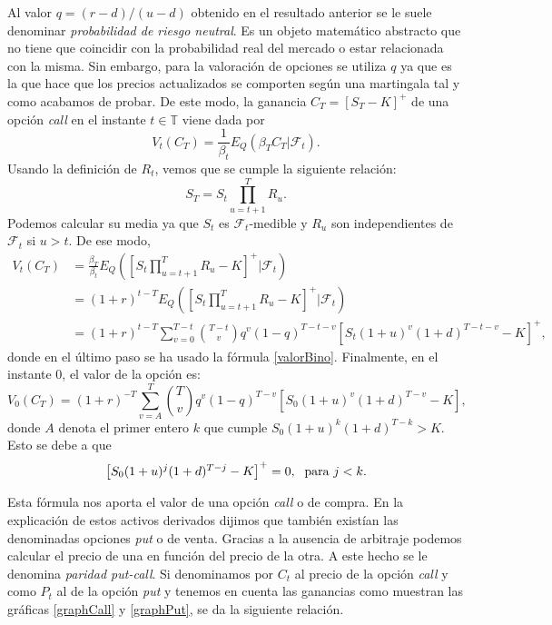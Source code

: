 Al valor $ q = (r-d)/(u-d) $ obtenido en el resultado anterior se le suele denominar \textit{probabilidad de riesgo neutral}. Es un objeto matemático abstracto que no tiene que coincidir con la probabilidad real del mercado o estar relacionada con la misma. Sin embargo, para la valoración de opciones se utiliza $ q $ ya que es la que hace que los precios actualizados se comporten según una martingala tal y como acabamos de probar. De este modo, la ganancia $ C_T = \left[S_T - K\right]^+$ de una opción \textit{call} en el instante $ t \in \mathbb{T} $ viene dada por
\[
V_t(C_T) = \frac{1}{\beta_t} E_Q(\beta_T C_T | \mathcal{F}_t).
\]
Usando la definición de $ R_t $, vemos que se cumple la siguiente relación:
\[
S_T = S_t \prod_{u = t+1}^{T}R_u.
\]
Podemos calcular su media ya que $ S_t $ es $ \mathcal{F}_t $-medible y $ R_u $ son independientes de $ \mathcal{F}_t $ si $ u > t $. De ese modo,
\begin{equation*}
\begin{split}
V_t (C_T) &= \frac{\beta_T}{\beta_t}E_Q(\left[S_t\prod_{u=t+1}^{T}R_u - K\right]^+ | \mathcal{F}_t) \\
&= (1+r)^{t-T} E_Q(\left[S_t\prod_{u=t+1}^{T}R_u - K\right]^+| \mathcal{F}_t) \\
& = (1+r)^{t-T} \sum_{v=0}^{T-t}\binom{T-t}{v}q^v(1-q)^{T-t-v}\left[S_t(1+u)^v(1+d)^{T-t-v}-K\right]^+,
\end{split}
\end{equation*}
donde en el último paso se ha usado la fórmula \eqref{valorBino}. Finalmente, en el instante 0, el valor de la opción es:
\begin{equation*}
V_0(C_T) = (1+r)^{-T} \sum_{v=A}^{T}\binom{T}{v}q^v(1-q)^{T-v}\left[S_0(1+u)^v(1+d)^{T-v}-K\right],
\end{equation*}
donde $ A $ denota el primer entero $ k $ que cumple $ S_0(1+u)^k(1+d)^{T-k} > K $. Esto se debe a que \[\left[S_0(1+u)^j(1+d)^{T-j}-K\right]^+ = 0, \hspace{1mm}\text{ para } j<k.\]

Esta fórmula nos aporta el valor de una opción \textit{call} o de compra. En la explicación de estos activos derivados dijimos que también existían las denominadas opciones \textit{put} o de venta. Gracias a la ausencia de arbitraje podemos calcular el precio de una en función del precio de la otra. A este hecho se le denomina \textit{paridad put-call}. Si denominamos por $ C_t $ al precio de la opción \textit{call} y como $ P_t $ al de la opción \textit{put} y tenemos en cuenta las ganancias como muestran las gráficas \ref{graphCall} y \ref{graphPut}, se da la siguiente relación. 

